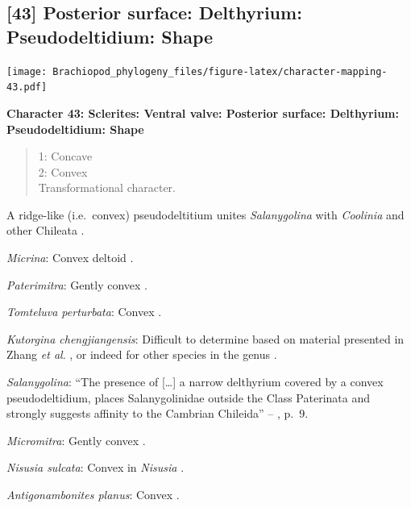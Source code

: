 \documentclass[]{book}
\theoremstyle{definition}
\theoremstyle{definition}
\theoremstyle{definition}
\theoremstyle{remark}
\begin{document}
\hypertarget{posterior-surface-delthyrium-pseudodeltidium-shape}{%
\subsection*{{[}43{]} Posterior surface: Delthyrium: Pseudodeltidium:
Shape}\label{posterior-surface-delthyrium-pseudodeltidium-shape}}

\texttt{[image: Brachiopod\_phylogeny\_files/figure-latex/character-mapping-43.pdf]}

\textbf{Character 43: Sclerites: Ventral valve: Posterior surface:
Delthyrium: Pseudodeltidium: Shape}

\begin{quote}
1: Concave\\
2: Convex\\
Transformational character.
\end{quote}

A ridge-like (i.e.~convex) pseudodeltitium unites \emph{Salanygolina}
with \emph{Coolinia} and other Chileata
\citep[p.~6]{Holmer2009Theenigmatic}.

\emph{Micrina}: Convex deltoid \citep{Holmer2008TheEarly}.

\emph{Paterimitra}: Gently convex \citep[see][fig.
83.1]{Williams2000BrachiopodaLinguliformea}.

\emph{Tomteluva perturbata}: Convex \citep{Streng2016Anew}.

\emph{Kutorgina chengjiangensis}: Difficult to determine based on
material presented in Zhang \emph{et al}.
\citeyearpar{Zhang2007Rhynchonelliformeanbrachiopods}, or indeed for
other species in the genus
\citep[e.g.][]{Williams2000BrachiopodaLinguliformea, Skovsted2005EarlyCambrian, Holmer2018Theattachment}.

\emph{Salanygolina}: ``The presence of {[}\ldots{}{]} a narrow
delthyrium covered by a convex pseudodeltidium, places Salanygolinidae
outside the Class Paterinata and strongly suggests affinity to the
Cambrian Chileida'' -- \citet{Holmer2009Theenigmatic}, p.~9.

\emph{Micromitra}: Gently convex \citep[see][fig.
83.3]{Williams2000BrachiopodaLinguliformea}.

\emph{Nisusia sulcata}: Convex in \emph{Nisusia} \citep[see][fig.
8.4]{Rowell1985Theevolutionary}.

\emph{Antigonambonites planus}: Convex \citep[fig.
508]{Williams2000BrachiopodaLinguliformea}.
\end{document}
